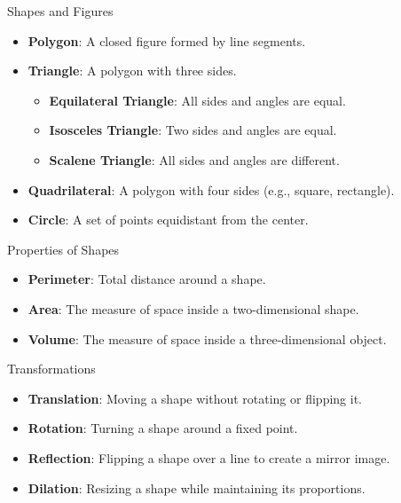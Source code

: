 \documentclass{beamer}
\begin{document}
\begin{frame}{Shapes and Figures}
    \begin{itemize}
        \item \textbf{Polygon}: A closed figure formed by line segments.
        \item \textbf{Triangle}: A polygon with three sides.
        \begin{itemize}
            \item \textbf{Equilateral Triangle}: All sides and angles are equal.
            \item \textbf{Isosceles Triangle}: Two sides and angles are equal.
            \item \textbf{Scalene Triangle}: All sides and angles are different.
        \end{itemize}
        \item \textbf{Quadrilateral}: A polygon with four sides (e.g., square, rectangle).
        \item \textbf{Circle}: A set of points equidistant from the center.
    \end{itemize}
\end{frame}

\begin{frame}{Properties of Shapes}
    \begin{itemize}
        \item \textbf{Perimeter}: Total distance around a shape.
        \item \textbf{Area}: The measure of space inside a two-dimensional shape.
        \item \textbf{Volume}: The measure of space inside a three-dimensional object.
    \end{itemize}
\end{frame}

\begin{frame}{Transformations}
    \begin{itemize}
        \item \textbf{Translation}: Moving a shape without rotating or flipping it.
        \item \textbf{Rotation}: Turning a shape around a fixed point.
        \item \textbf{Reflection}: Flipping a shape over a line to create a mirror image.
        \item \textbf{Dilation}: Resizing a shape while maintaining its proportions.
    \end{itemize}
\end{frame}
\end{document}
